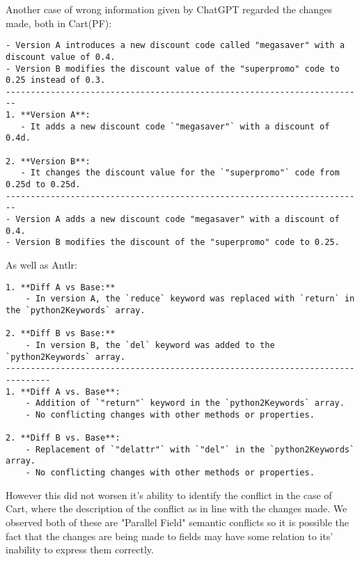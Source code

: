 Another case of wrong information given by ChatGPT regarded the changes made, both in Cart(PF):
\begin{lstlisting}
- Version A introduces a new discount code called "megasaver" with a discount value of 0.4.
- Version B modifies the discount value of the "superpromo" code to 0.25 instead of 0.3.
------------------------------------------------------------------------
1. **Version A**:
   - It adds a new discount code `"megasaver"` with a discount of 0.4d.

2. **Version B**:
   - It changes the discount value for the `"superpromo"` code from 0.25d to 0.25d.
------------------------------------------------------------------------
- Version A adds a new discount code "megasaver" with a discount of 0.4.
- Version B modifies the discount of the "superpromo" code to 0.25.
\end{lstlisting}
As well as Antlr:
\begin{lstlisting}
1. **Diff A vs Base:**
    - In version A, the `reduce` keyword was replaced with `return` in the `python2Keywords` array.
 
2. **Diff B vs Base:**
    - In version B, the `del` keyword was added to the `python2Keywords` array.
-------------------------------------------------------------------------------
1. **Diff A vs. Base**:
    - Addition of `"return"` keyword in the `python2Keywords` array.
    - No conflicting changes with other methods or properties.
 
2. **Diff B vs. Base**:
    - Replacement of `"delattr"` with `"del"` in the `python2Keywords` array.
    - No conflicting changes with other methods or properties.
\end{lstlisting}
However this did not worsen it's ability to identify the conflict in the case of Cart, where the description of the conflict as in line with the changes made.
We observed both of these are "Parallel Field" semantic conflicts so it is possible the fact that the changes are being made to fields may have some relation to its' inability to express them correctly.

